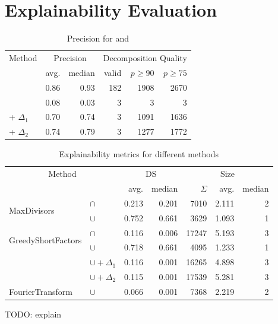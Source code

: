 \section{Explainability Evaluation}
\label{ch:Evaluation:explainability}


\begin{table}[h]
	\centering
	\begin{tabular}{l|rr|rrr}
		\multicolumn{1}{c}{Method} & \multicolumn{2}{c}{Precision} & \multicolumn{3}{c}{Decomposition Quality} \\
		& avg. & median & valid & $p \geq 90$ & $p \geq 75$ \\
		\hline
		\andDecomp & 0.86 & 0.93 &  182 & 1908 & 2670\\
		\orDecomp & 0.08 & 0.03 & 3 & 3 & 3 \\
		\orDecomp + $\Delta_1$ & 0.70 & 0.74 & 3 & 1091 & 1636  \\
		\orDecomp + $\Delta_2$ & 0.74 & 0.79 & 3 & 1277 & 1772 \\
	\end{tabular}
	\caption{Precision for \andDecomp and \orDecomp}
	\label{tab:eval-precision}
\end{table}


\begin{table}[h]
	\centering
	\begin{tabular}{ll|rr|rrr}
		\multicolumn{2}{c}{Method} &  \multicolumn{2}{c}{DS} & \multicolumn{3}{c}{Size}  \\
		& & avg. & median & $\Sigma$ & avg. & median\\
		\hline
		\multirow{2}{*}{MaxDivisors} & $\cap$ & 0.213 & 0.201 & 7010 & 2.111 & 2 \\
		& $\cup$ & 0.752 & 0.661 & 3629 & 1.093 & 1 \\
		\hline
		\multirow{2}{*}{GreedyShortFactors} & $\cap$  & 0.116 & 0.006 & 17247 & 5.193 & 3 \\
		& $\cup$ & 0.718 & 0.661 & 4095 & 1.233 & 1 \\
		& $\cup + \Delta_1$ & 0.116 & 0.001  & 16265 & 4.898 & 3\\
		& $\cup + \Delta_2$ & 0.115 & 0.001  & 17539 & 5.281 & 3\\
		\hline
		FourierTransform & $\cup$ & 0.066 & 0.001 & 7368 & 2.219 & 2 \\
	\end{tabular}
	\caption{Explainability metrics for different methods}
	\label{tab:eval-metric}
\end{table}


TODO: explain
